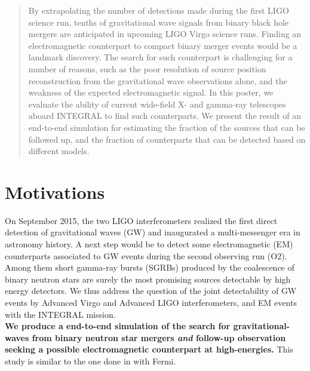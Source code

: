 \documentclass[a0,portrait]{a0poster}
\renewcommand{\emph}[1]{\textbf{\color{blue}#1}}
\newcommand{\ECM}[1] {\textbf{\textcolor{magenta}{#1}}}
\begin{document}
\begin{multicols}{2} %


 \begin{abstract}
   By extrapolating the number of detections made during the first LIGO science
   run, tenths of gravitational wave signals from binary black hole mergers are
   anticipated in upcoming LIGO Virgo science runs. Finding an electromagnetic
   counterpart to compact binary merger events would be a landmark
   discovery. The search for such counterpart is challenging for a number of
   reasons, such as the poor resolution of source position reconstruction from
   the gravitational wave observations alone, and the weakness of the expected
   electromagnetic signal. In this poster, we evaluate the ability of current
   wide-field X- and gamma-ray telescopes aboard INTEGRAL to find such
   counterparts. We present the result of an end-to-end simulation for
   estimating the fraction of the sources that can be followed up, and the
   fraction of counterparts that can be detected based on different models.
 \end{abstract}


\section*{Motivations}

On September 2015, the two LIGO interferometers realized the first direct detection of gravitational waves (GW) and inaugurated a multi-messenger era in astronomy history. A next step would be to detect some electromagnetic (EM) counterparts associated to GW events during the second observing run (O2). Among them short gamma-ray bursts (SGRBs) produced by the coalescence of binary neutron stars are surely the most promising sources detectable by high energy detectors. We thus address the question of the joint detectability of GW events by Advanced Virgo and Advanced LIGO interferometers, and EM events with the INTEGRAL mission. \\
\emph{We produce a end-to-end simulation of the search for gravitational-waves
from binary neutron star mergers \textit{and} follow-up observation seeking a
 possible electromagnetic counterpart at high-energies.} This study is similar
to the one done in \cite{2016arXiv160606124P} with Fermi.


\end{multicols}
\end{document}
